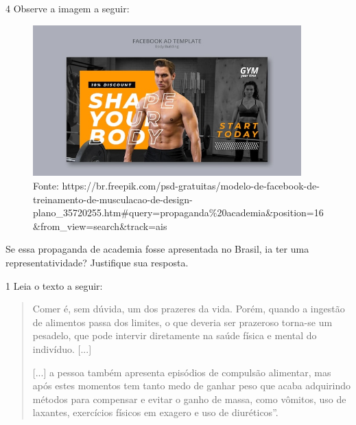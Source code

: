 \num{4}  Observe a imagem a seguir:

\begin{figure}[htpb!]
\includegraphics[width=4.07407in,height=2.28999in]{./imgs/img4.jpg}
\caption{Fonte: https://br.freepik.com/psd-gratuitas/modelo-de-facebook-de-treinamento-de-musculacao-de-design-plano\_35720255.htm\#query=propaganda\%20academia\&position=16\&from\_view=search\&track=ais}
\end{figure}

Se essa propaganda de academia fosse apresentada no Brasil, ia ter uma
representatividade? Justifique sua resposta.




\num{1} Leia o texto a seguir:

\begin{quote}
Comer é, sem dúvida, um dos prazeres da vida. Porém, quando a ingestão
de alimentos passa dos limites, o que deveria ser prazeroso torna-se um
pesadelo, que pode intervir diretamente na saúde física e mental do
indivíduo. {[}...{]}

{[}...{]} a pessoa também apresenta episódios de compulsão alimentar,
mas após estes momentos tem tanto medo de ganhar peso que acaba
adquirindo métodos para compensar e evitar o ganho de massa, como
vômitos, uso de laxantes, exercícios físicos em exagero e uso de
diuréticos''.

\end{quote}

